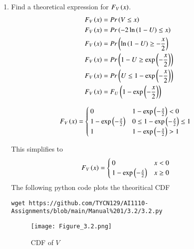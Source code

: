 \documentclass[journal,12pt,twocolumn]{IEEEtran}
\renewcommand\thesection{\arabic{section}}
\begin{document}
\begin{enumerate}[label=\thesection.\arabic*
,ref=\thesection.\theenumi]
\item Find a theoretical expression for $F_V\left(x\right)$.
\\
\solution 
\begin{align}
	F_V\left(x\right) &= Pr\left(V\le x\right) \\
	F_V\left(x\right) &= Pr\left(-2\ln{\ensuremath{\left(1-U\right)}} \le x\right)	\\
	F_V\left(x\right) &= Pr\left(\ln{\ensuremath{\left(1-U\right)}} \ge -\frac{x}{2}\right)	\\
	F_V\left(x\right) &= Pr\left(1-U \ge \exp{\ensuremath{\left(-\frac{x}{2}\right)} }\right)	\\
	F_V\left(x\right) &= Pr\left(U \le 1- \exp{\ensuremath{\left(-\frac{x}{2}\right)} }\right) \\
	F_V\left(x\right) &= F_U\left(1- \exp{\ensuremath{\left(-\frac{x}{2}\right)} }\right)		
\end{align}
\begin{small}
\begin{align}
	F_V\left(x\right) &=
    \begin{cases}  
        0 & 1- \exp{\ensuremath{\left(-\frac{x}{2}\right)} } < 0\\
        1- \exp{\ensuremath{\left(-\frac{x}{2}\right)} } & 0 \le 1- \exp{\ensuremath{\left(-\frac{x}{2}\right)} } \le 1 \\
        1 & 1 - \exp{\ensuremath{\left(-\frac{x}{2}\right)} > 1 }
    \end{cases}
\end{align}
\end{small}
This simplifies to
\begin{align}
	F_V\left(x\right) &=
    \begin{cases}  
        0 & x < 0\\
        1- \exp{\ensuremath{\left(-\frac{x}{2}\right)}} & x \ge 0
    \end{cases}
    \label{eq:F_V}
\end{align}
The following python code plots the theoritical CDF
\begin{lstlisting}
wget https://github.com/TYCN129/AI1110-Assignments/blob/main/Manual%201/3.2/3.2.py
\end{lstlisting}
\begin{figure}[H]
    \centering
    \texttt{[image: Figure\_3.2.png]}
    \caption{CDF of $V$}
    \label{fig:my_label}
\end{figure}
\end{enumerate}
\end{document}
